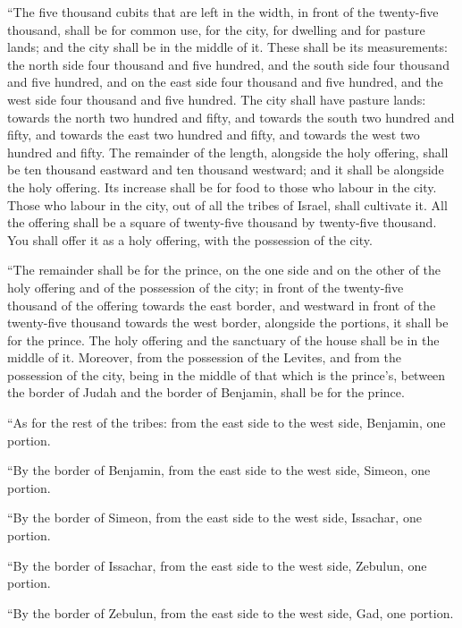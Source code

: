  ``The five thousand cubits that are left in the width,
in front of the twenty-five thousand, shall be for common use, for the
city, for dwelling and for pasture lands; and the city shall be in the
middle of it.  These shall be its measurements: the north
side four thousand and five hundred, and the south side four thousand
and five hundred, and on the east side four thousand and five hundred,
and the west side four thousand and five hundred.  The
city shall have pasture lands: towards the north two hundred and fifty,
and towards the south two hundred and fifty, and towards the east two
hundred and fifty, and towards the west two hundred and fifty.
 The remainder of the length, alongside the holy
offering, shall be ten thousand eastward and ten thousand westward; and
it shall be alongside the holy offering. Its increase shall be for food
to those who labour in the city.  Those who labour in the
city, out of all the tribes of Israel, shall cultivate it.
 All the offering shall be a square of twenty-five
thousand by twenty-five thousand. You shall offer it as a holy offering,
with the possession of the city.

 ``The remainder shall be for the prince, on the one side
and on the other of the holy offering and of the possession of the city;
in front of the twenty-five thousand of the offering towards the east
border, and westward in front of the twenty-five thousand towards the
west border, alongside the portions, it shall be for the prince. The
holy offering and the sanctuary of the house shall be in the middle of
it.  Moreover, from the possession of the Levites, and
from the possession of the city, being in the middle of that which is
the prince's, between the border of Judah and the border of Benjamin,
shall be for the prince.

 ``As for the rest of the tribes: from the east side to
the west side, Benjamin, one portion.

 ``By the border of Benjamin, from the east side to the
west side, Simeon, one portion.

 ``By the border of Simeon, from the east side to the
west side, Issachar, one portion.

 ``By the border of Issachar, from the east side to the
west side, Zebulun, one portion.

 ``By the border of Zebulun, from the east side to the
west side, Gad, one portion.

